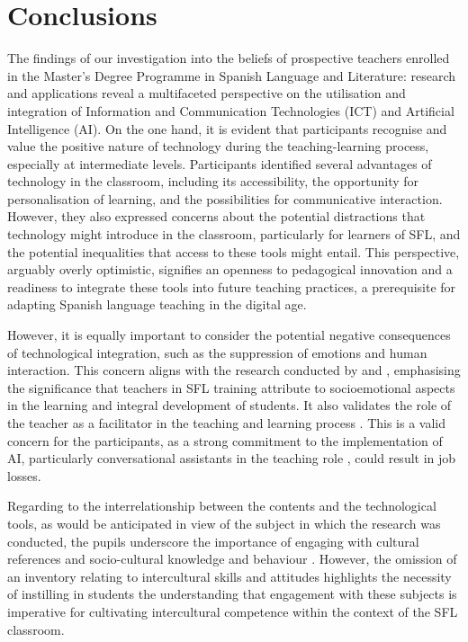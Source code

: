 \documentclass[english]{textolivre}
\begin{document}
\section{Conclusions}
The findings of our investigation into the beliefs of prospective teachers enrolled in the Master's Degree Programme in Spanish Language and Literature: research and applications reveal a multifaceted perspective on the utilisation and integration of Information and Communication Technologies (ICT) and Artificial Intelligence (AI). On the one hand, it is evident that participants recognise and value the positive nature of technology during the teaching-learning process, especially at intermediate levels. Participants identified several advantages of technology in the classroom, including its accessibility, the opportunity for personalisation of learning, and the possibilities for communicative interaction. However, they also expressed concerns about the potential distractions that technology might introduce in the classroom, particularly for learners of SFL, and the potential inequalities that access to these tools might entail. This perspective, arguably overly optimistic, signifies an openness to pedagogical innovation and a readiness to integrate these tools into future teaching practices, a prerequisite for adapting Spanish language teaching in the digital age.

However, it is equally important to consider the potential negative consequences of technological integration, such as the suppression of emotions and human interaction. This concern aligns with the research conducted by \textcite{canales2024} and \textcite{sandoval2024}, emphasising the significance that teachers in SFL training attribute to socioemotional aspects in the learning and integral development of students. It also validates the role of the teacher as a facilitator in the teaching and learning process \cite{martin-marchante2022, rodriguez2024}. This is a valid concern for the participants, as a strong commitment to the implementation of AI, particularly conversational assistants in the teaching role \cite{moreno-padilla2019}, could result in job losses.

Regarding to the interrelationship between the contents and the technological tools, as would be anticipated in view of the subject in which the research was conducted, the pupils underscore the importance of engaging with cultural references and socio-cultural knowledge and behaviour \cite{cervantes2006}. However, the omission of an inventory relating to intercultural skills and attitudes highlights the necessity of instilling in students the understanding that engagement with these subjects is imperative for cultivating intercultural competence within the context of the SFL classroom.
\end{document}

